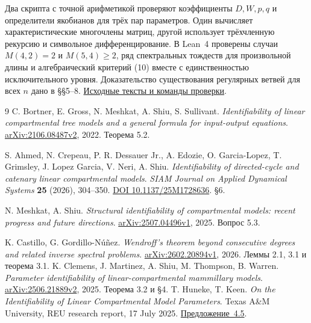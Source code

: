 \documentclass[11pt,a4paper]{article}
\begin{document}
Два скрипта с точной арифметикой проверяют коэффициенты \(D,W,p,q\) и определители якобианов для трёх пар параметров. Один вычисляет характеристические многочлены матриц, другой использует трёхчленную рекурсию и символьное дифференцирование. В Lean~4 проверены случаи \(M(4,2)=2\) и \(M(5,4)\ge2\), ряд спектральных тождеств для произвольной длины и алгебраический критерий (10) вместе с единственностью исключительного уровня. Доказательство существования регулярных ветвей для всех \(n\) дано в §§5–8. \href{https://github.com/qqhgdkktu/catenary-identifiability/tree/global-multiplicity-v2/global-multiplicity}{Исходные тексты и команды проверки}.

\begin{thebibliography}{9}
 C. Bortner, E. Gross, N. Meshkat, A. Shiu, S. Sullivant. \textit{Identifiability of linear compartmental tree models and a general formula for input-output equations}. \href{https://arxiv.org/abs/2106.08487v2}{arXiv:2106.08487v2}, 2022. Теорема 5.2.

 S. Ahmed, N. Crepeau, P. R. Dessauer Jr., A. Edozie, O. Garcia-Lopez, T. Grimsley, J. Lopez Garcia, V. Neri, A. Shiu. \textit{Identifiability of directed-cycle and catenary linear compartmental models}. \textit{SIAM Journal on Applied Dynamical Systems} \textbf{25} (2026), 304--350. \href{https://doi.org/10.1137/25M1728636}{DOI 10.1137/25M1728636}. §6.

 N. Meshkat, A. Shiu. \textit{Structural identifiability of compartmental models: recent progress and future directions}. \href{https://arxiv.org/abs/2507.04496v1}{arXiv:2507.04496v1}, 2025. Вопрос 5.3.

 K. Castillo, G. Gordillo-Núñez. \textit{Wendroff’s theorem beyond consecutive degrees and related inverse spectral problems}. \href{https://arxiv.org/abs/2602.20894v1}{arXiv:2602.20894v1}, 2026. Леммы 2.1, 3.1 и теорема 3.1.
 K. Clemens, J. Martinez, A. Shiu, M. Thompson, B. Warren. \textit{Parameter identifiability of linear-compartmental mammillary models}. \href{https://arxiv.org/abs/2506.21889v2}{arXiv:2506.21889v2}, 2025. Теорема 3.2 и §4.
 T. Huneke, T. Keen. \textit{On the Identifiability of Linear Compartmental Model Parameters}. Texas A\&M University, REU research report, 17 July 2025. \href{https://artsci.tamu.edu/mathematics/_files/_docs/reu/results/2025/huneke-keen-report.pdf}{Предложение~4.5}.
\end{thebibliography}
\end{document}
